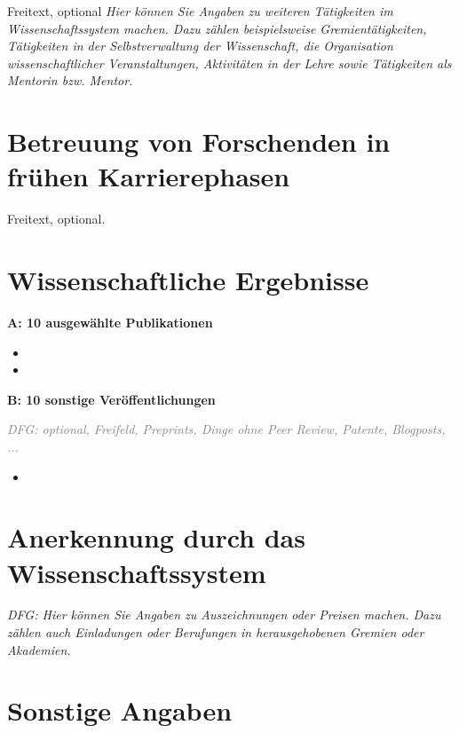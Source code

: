 \documentclass[a4paper,11pt]{article}
\begin{document}
Freitext, optional
\emph{Hier können Sie Angaben zu weiteren Tätigkeiten im
Wissenschaftssystem machen. Dazu zählen beispielsweise
Gremientätigkeiten, Tätigkeiten in der Selbstverwaltung der
Wissenschaft, die Organisation wissenschaftlicher Veranstaltungen,
Aktivitäten in der Lehre sowie Tätigkeiten als Mentorin
bzw. Mentor.}

\section*{Betreuung von Forschenden in frühen Karrierephasen}

Freitext, optional.

\section*{Wissenschaftliche Ergebnisse}

\textbf{A: 10 ausgewählte Publikationen}

\medskip

\begin{itemize}
\item {}
\item {}
\end{itemize}

\medskip 

\textbf{B: 10 sonstige Veröffentlichungen}

\textcolor{gray}{\emph{DFG: optional, Freifeld, Preprints, Dinge ohne Peer Review, Patente, Blogposts, ...}}

\begin{itemize}
\item {}
\end{itemize}

\section*{Anerkennung durch das Wissenschaftssystem}

\emph{DFG: Hier können Sie Angaben zu Auszeichnungen oder Preisen
machen. Dazu zählen auch Einladungen oder Berufungen in
herausgehobenen Gremien oder Akademien.  }

\section*{Sonstige Angaben}
\end{document}
